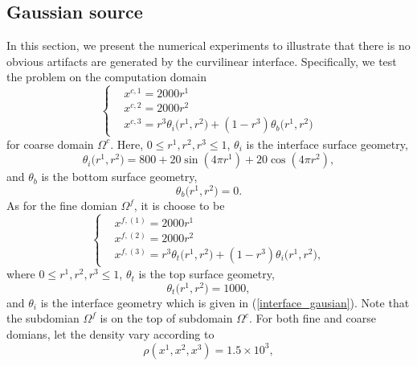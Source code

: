 \subsection{Gaussian source}\label{gaussian_source}
In this section, we present the numerical experiments to illustrate that there is no obvious artifacts are generated by the curvilinear interface. Specifically, we test the problem on the computation domain
\begin{equation}
\left\{
\begin{aligned}
& x^{c,1} = 2000 r^1\\
& x^{c,2} = 2000 r^2\\
& x^{c,3} = r^3 \theta_i\big(r^1,r^2\big) + (1-r^3) \theta_b\big(r^1,r^2\big)
\end{aligned}
\right.
\end{equation}
for coarse domain $\Omega^c$. Here, $0\leq r^1, r^2, r^3\leq 1$, $\theta_i$ is the interface surface geometry,
\begin{equation}\label{interface_gausian}
\theta_i\big(r^1,r^2\big) = 800+20\sin(4\pi r^1)+20\cos(4\pi r^2),
\end{equation}
and 
$\theta_b$ is the bottom surface geometry,
\begin{equation}
\theta_b\big(r^1,r^2\big) = 0.
\end{equation}
As for the fine domian $\Omega^f$, it is choose to be
\begin{equation}
\left\{
\begin{aligned}
& x^{f,(1)} = 2000 r^1\\
& x^{f,(2)} = 2000 r^2\\
& x^{f,(3)} = r^3\theta_t\big(r^1,r^2\big) + (1-r^3)\theta_i\big(r^1,r^2\big),
\end{aligned}
\right.
\end{equation}
where $0\leq r^1, r^2, r^3\leq 1$, $\theta_t$ is the top surface geometry,
\begin{equation}
\theta_t\big(r^1,r^2\big) = 1000,
\end{equation}
and $\theta_i$ is the interface geometry which is given in (\ref{interface_gausian}). Note that the subdomian 
$\Omega^f$ is on the top of subdomain $\Omega^c$. For both fine and coarse domians, let the density vary according to
\begin{equation}
\rho(x^1,x^2,x^3) = 1.5\times 10^3,
\end{equation}
